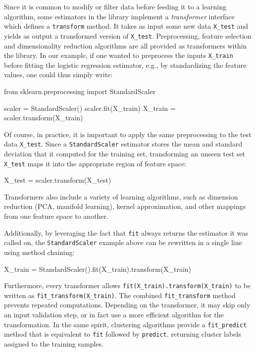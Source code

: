 \documentclass{llncs}
\begin{document}
Since it is common to modify or filter data before feeding it to a learning
algorithm, some estimators in the library implement a \textit{transformer}
interface which defines a \texttt{transform} method. It takes as input some new
data \texttt{X\_test} and yields as output a transformed version of
\texttt{X\_test}. Preprocessing, feature selection and dimensionality reduction
algorithms are all provided as transformers within the library.  In our example,
if one wanted to preprocess the inputs \texttt{X\_train} before fitting the
logistic regression estimator, e.g., by standardizing the feature values, one
could thus simply write:
\begin{pythoncode}
from sklearn.preprocessing import StandardScaler

scaler = StandardScaler()
scaler.fit(X_train)
X_train = scaler.transform(X_train)
\end{pythoncode}
Of course, in practice, it is important to apply the same preprocessing to the
test data \texttt{X\_test}. Since a \texttt{StandardScaler} estimator stores the
mean and standard deviation that it computed for the training set, transforming
an unseen test set \texttt{X\_test} maps it into the appropriate region of
feature space:
\begin{pythoncode}
X_test = scaler.transform(X_test)
\end{pythoncode}
Transformers also include a variety of learning algorithms, such as
dimension reduction (PCA, manifold learning), kernel approximation,
and other mappings from one feature space to another.

Additionally, by leveraging the fact that \texttt{fit} always returns the
estimator it was called on, the \texttt{StandardScaler} example above can be
rewritten in a single line using method chaining:
\begin{pythoncode}
X_train = StandardScaler().fit(X_train).transform(X_train)
\end{pythoncode}

Furthermore, every transformer allows \texttt{fit(X\_train).transform(X\_train)}
to be written as \texttt{fit\_transform(X\_train)}.
The combined \texttt{fit\_transform} method prevents repeated computations.
Depending on the transformer,
it may skip only an input validation step,
or in fact use a more efficient algorithm for the transformation.
In the same spirit, clustering algorithms provide a
\texttt{fit\_predict} method
that is equivalent to \texttt{fit} followed by \texttt{predict},
returning cluster labels assigned to the training samples.
\end{document}
